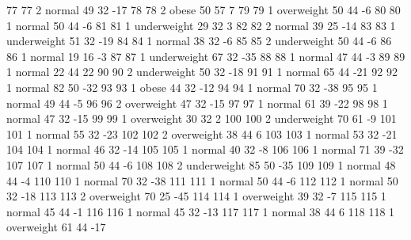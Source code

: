 \begin{Schunk}
\begin{Soutput}
		77           77   2      normal  49         32          -17
		78           78   2       obese  50         57            7
		79           79   1  overweight  50         44           -6
		80           80   1      normal  50         44           -6
		81           81   1 underweight  29         32            3
		82           82   2      normal  39         25          -14
		83           83   1 underweight  51         32          -19
		84           84   1      normal  38         32           -6
		85           85   2 underweight  50         44           -6
		86           86   1      normal  19         16           -3
		87           87   1 underweight  67         32          -35
		88           88   1      normal  47         44           -3
		89           89   1      normal  22         44           22
		90           90   2 underweight  50         32          -18
		91           91   1      normal  65         44          -21
		92           92   1      normal  82         50          -32
		93           93   1       obese  44         32          -12
		94           94   1      normal  70         32          -38
		95           95   1      normal  49         44           -5
		96           96   2  overweight  47         32          -15
		97           97   1      normal  61         39          -22
		98           98   1      normal  47         32          -15
		99           99   1  overweight  30         32            2
		100         100   2 underweight  70         61           -9
		101         101   1      normal  55         32          -23
		102         102   2  overweight  38         44            6
		103         103   1      normal  53         32          -21
		104         104   1      normal  46         32          -14
		105         105   1      normal  40         32           -8
		106         106   1      normal  71         39          -32
		107         107   1      normal  50         44           -6
		108         108   2 underweight  85         50          -35
		109         109   1      normal  48         44           -4
		110         110   1      normal  70         32          -38
		111         111   1      normal  50         44           -6
		112         112   1      normal  50         32          -18
		113         113   2  overweight  70         25          -45
		114         114   1  overweight  39         32           -7
		115         115   1      normal  45         44           -1
		116         116   1      normal  45         32          -13
		117         117   1      normal  38         44            6
		118         118   1  overweight  61         44          -17

\end{Soutput}
\end{Schunk}
